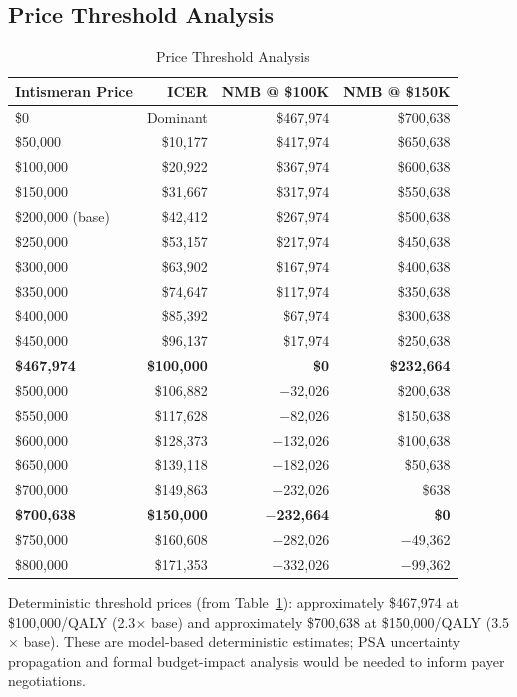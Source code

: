 \documentclass[11pt,a4paper]{article}
\begin{document}
\subsection{Price Threshold Analysis}
\label{sec:price_threshold}
\begin{table}[H]
\centering
\caption{Price Threshold Analysis}
\label{tab:s14}
\begin{tabular}{lrrr}
\toprule
\textbf{Intismeran Price} & \textbf{ICER} & \textbf{NMB @ \$100K} & \textbf{NMB @ \$150K} \\
\midrule
\$0 & Dominant & \$467,974 & \$700,638 \\
\$50,000 & \$10,177 & \$417,974 & \$650,638 \\
\$100,000 & \$20,922 & \$367,974 & \$600,638 \\
\$150,000 & \$31,667 & \$317,974 & \$550,638 \\
\$200,000 (base) & \$42,412 & \$267,974 & \$500,638 \\
\$250,000 & \$53,157 & \$217,974 & \$450,638 \\
\$300,000 & \$63,902 & \$167,974 & \$400,638 \\
\$350,000 & \$74,647 & \$117,974 & \$350,638 \\
\$400,000 & \$85,392 & \$67,974 & \$300,638 \\
\$450,000 & \$96,137 & \$17,974 & \$250,638 \\
\textbf{\$467,974} & \textbf{\$100,000} & \textbf{\$0} & \textbf{\$232,664} \\
\$500,000 & \$106,882 & $-$32,026 & \$200,638 \\
\$550,000 & \$117,628 & $-$82,026 & \$150,638 \\
\$600,000 & \$128,373 & $-$132,026 & \$100,638 \\
\$650,000 & \$139,118 & $-$182,026 & \$50,638 \\
\$700,000 & \$149,863 & $-$232,026 & \$638 \\
\textbf{\$700,638} & \textbf{\$150,000} & \textbf{$-$232,664} & \textbf{\$0} \\
\$750,000 & \$160,608 & $-$282,026 & $-$49,362 \\
\$800,000 & \$171,353 & $-$332,026 & $-$99,362 \\
\end{tabular}
\end{table}
\noindent Deterministic threshold prices (from Table~\ref{tab:s14}): approximately \$467,974 at \$100,000/QALY (2.3$\times$ base) and approximately \$700,638 at \$150,000/QALY (3.5$\times$ base). These are model-based deterministic estimates; PSA uncertainty propagation and formal budget-impact analysis would be needed to inform payer negotiations.
\end{document}
